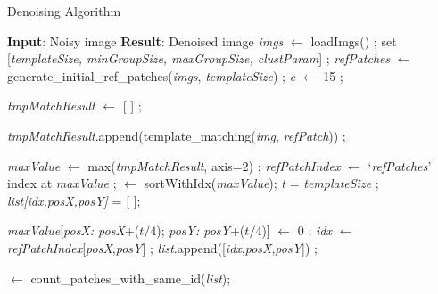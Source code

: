 \documentclass[fleqn,10pt]{wlscirep}
\begin{document}
	\begin{algorithm}
		\caption{Denoising Algorithm}
		\label{algorithm:denoising_algorithm}
		\begin{algorithmic}[1]
			\State \textbf{Input}: Noisy image
			\State \textbf{Result}: Denoised image
			\State \textit{imgs} $\gets$ loadImgs() ;
			\State set [\textit{templateSize, minGroupSize, maxGroupSize, clustParam}] ;
			\State \textit{refPatches} $\gets$ generate\_initial\_ref\_patches(\textit{imgs}, \textit{templateSize}) ;
			\State \textit{c} $\gets$ 15 ;
			
			
			\State \textit{tmpMatchResult} $\gets$ [ ]	;		
			
			
			\State \textit{tmpMatchResult}.append(template\_matching(\textit{img}, \textit{refPatch})) ;
			
			\EndFor
			\EndFor
			
			\State \textit{maxValue} $\gets$ max(\textit{tmpMatchResult}, axis=2) ;
			\State \textit{refPatchIndex} $\gets$ `\textit{refPatches}' index at \textit{maxValue} ;
			 $\gets$ sortWithIdx(\textit{maxValue}); 
			\State \textit{t} = \textit{templateSize} ;
			\State \textit{list[\textit{idx},\textit{posX},\textit{posY}]} = [ ];
				
				\State \textit{maxValue}[\textit{posX: posX}+($t/4$); \textit{posY: posY}+($t/4$)] $\gets$ 0 ;
				\State \textit{idx} $\gets$ \textit{refPatchIndex}[\textit{posX},\textit{posY}] ;
				\State \textit{list}.append([\textit{idx},\textit{posX},\textit{posY}]) ;
				\EndIf
				\EndFor
				
				 $\gets$ count\_patches\_with\_same\_id(\textit{list});
				

\end{algorithmic}
\end{algorithm}
\end{document}
